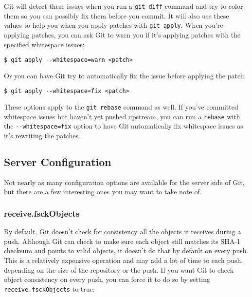 \documentclass[a4paper]{book}
\begin{document}
Git will detect these issues when you run a \texttt{git diff} command and try to color them so you can possibly fix them before you commit. It will also use these values to help you when you apply patches with \texttt{git apply}. When you're applying patches, you can ask Git to warn you if it's applying patches with the specified whitespace issues:

\begin{shaded}\begin{verbatim}
$ git apply --whitespace=warn <patch>
\end{verbatim}\end{shaded}

Or you can have Git try to automatically fix the issue before applying the patch:

\begin{shaded}\begin{verbatim}
$ git apply --whitespace=fix <patch>
\end{verbatim}\end{shaded}

These options apply to the \texttt{git rebase} command as well. If you've committed whitespace issues but haven't yet pushed upstream, you can run a \texttt{rebase} with the \texttt{-{}-whitespace=fix} option to have Git automatically fix whitespace issues as it's rewriting the patches.

\subsection{Server Configuration}\label{server-configuration}

Not nearly as many configuration options are available for the server side of Git, but there are a few interesting ones you may want to take note of.

\subsubsection{receive.fsckObjects}

By default, Git doesn't check for consistency all the objects it receives during a push. Although Git can check to make sure each object still matches its SHA-1 checksum and points to valid objects, it doesn't do that by default on every push. This is a relatively expensive operation and may add a lot of time to each push, depending on the size of the repository or the push. If you want Git to check object consistency on every push, you can force it to do so by setting \texttt{receive.fsckObjects} to true:
\end{document}

